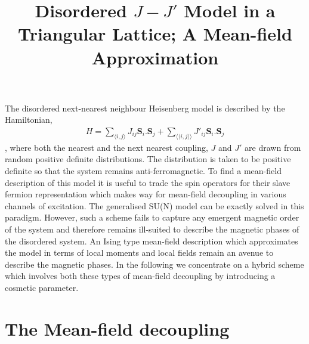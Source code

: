 \documentclass[notitlepage,onecolumn,showpacs,11pt]{revtex4-1}
\begin{document}
\title{Disordered $J-J'$ Model in a Triangular Lattice; A Mean-field Approximation}

\maketitle

The disordered next-nearest neighbour Heisenberg model is described by the 
Hamiltonian, 
\begin{equation}
	\begin{aligned}
		H=\sum_{\langle i,j\rangle}J_{ij}\boldsymbol{S}_{i}.\boldsymbol{S}_{j}+
		\sum_{\langle\langle i,j\rangle\rangle}J'_{ij}\boldsymbol{S}_{i}.
		\boldsymbol{S}_{j}
	\end{aligned}
\end{equation}
, where both the nearest and the next nearest coupling, $ J $ and $ J'$ are 
drawn from random positive definite distributions. The distribution is taken 
to be positive definite so that the system remains anti-ferromagnetic.
To find a mean-field description of this model it is useful to trade 
the spin operators for their slave fermion representation which makes 
way for mean-field decoupling in various channels of excitation. The 
generalised SU(N) model can be exactly solved in this paradigm. However, 
such a scheme fails to capture any emergent magnetic order of the system 
and therefore remains ill-suited to describe the magnetic phases of the 
disordered system. An Ising type mean-field description which approximates 
the model in terms of local moments and local fields remain an avenue to 
describe the magnetic phases. In the following we concentrate on a hybrid 
scheme which involves both these types of mean-field decoupling by introducing 
a cosmetic parameter.

\section{The Mean-field decoupling}
\end{document}

